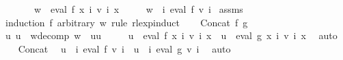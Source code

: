 \begin{isabellebody}
\ \ \ \ \ \ \ {\isachardoublequoteopen}w\ {\isasymin}\ eval\ f\ {\isacharparenleft}{\kern0pt}{\isasymlambda}x{\isachardot}{\kern0pt}\ {\isasymUnion}i{\isachardot}{\kern0pt}\ v\ i\ x{\isacharparenright}{\kern0pt}{\isachardoublequoteclose}\isanewline
\ \ \ \ \ {\isachardoublequoteopen}w\ {\isasymin}\ {\isacharparenleft}{\kern0pt}{\isasymUnion}i{\isachardot}{\kern0pt}\ eval\ f\ {\isacharparenleft}{\kern0pt}v\ i{\isacharparenright}{\kern0pt}{\isacharparenright}{\kern0pt}{\isachardoublequoteclose}\isanewline
%
\isadelimproof
%
\endisadelimproof
%
\isatagproof
{}\isamarkupfalse%
\ assms{\isacharparenleft}{\kern0pt}{}{\isacharparenright}{\kern0pt}\ \isamarkupfalse%
\ {\isacharparenleft}{\kern0pt}induction\ f\ arbitrary{\isacharcolon}{\kern0pt}\ w\ rule{\isacharcolon}{\kern0pt}\ rlexp{\isachardot}{\kern0pt}induct{\isacharparenright}{\kern0pt}\isanewline
\ \ \isamarkupfalse%
\ {\isacharparenleft}{\kern0pt}Concat\ f\ g{\isacharparenright}{\kern0pt}\isanewline
\ \ \isamarkupfalse%
\ \isamarkupfalse%
\ u\ u{\isacharprime}{\kern0pt}\ \ w{\isacharunderscore}{\kern0pt}decomp{\isacharcolon}{\kern0pt}\ {\isachardoublequoteopen}w\ {\isacharequal}{\kern0pt}\ u{\isacharat}{\kern0pt}u{\isacharprime}{\kern0pt}{\isachardoublequoteclose}\isanewline
\ \ \ \ \ {\isachardoublequoteopen}u\ {\isasymin}\ eval\ f\ {\isacharparenleft}{\kern0pt}{\isasymlambda}x{\isachardot}{\kern0pt}\ {\isasymUnion}i{\isachardot}{\kern0pt}\ v\ i\ x{\isacharparenright}{\kern0pt}\ {\isasymand}\ u{\isacharprime}{\kern0pt}\ {\isasymin}\ eval\ g\ {\isacharparenleft}{\kern0pt}{\isasymlambda}x{\isachardot}{\kern0pt}\ {\isasymUnion}i{\isachardot}{\kern0pt}\ v\ i\ x{\isacharparenright}{\kern0pt}{\isachardoublequoteclose}\ \isamarkupfalse%
\ auto\isanewline
\ \ \isamarkupfalse%
\ Concat\ \isamarkupfalse%
\ {\isachardoublequoteopen}u\ {\isasymin}\ {\isacharparenleft}{\kern0pt}{\isasymUnion}i{\isachardot}{\kern0pt}\ eval\ f\ {\isacharparenleft}{\kern0pt}v\ i{\isacharparenright}{\kern0pt}{\isacharparenright}{\kern0pt}\ {\isasymand}\ u{\isacharprime}{\kern0pt}\ {\isasymin}\ {\isacharparenleft}{\kern0pt}{\isasymUnion}i{\isachardot}{\kern0pt}\ eval\ g\ {\isacharparenleft}{\kern0pt}v\ i{\isacharparenright}{\kern0pt}{\isacharparenright}{\kern0pt}{\isachardoublequoteclose}\ \isamarkupfalse%
\ auto\isanewline
\ \ \isamarkupfalse%
\ \isamarkupfalse%

\end{isabellebody}
